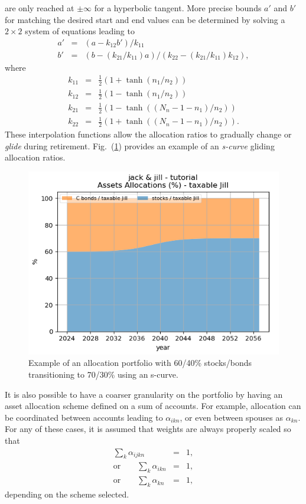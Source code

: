 \documentclass{report}[fleqn,11pt]
\begin{document}
\begin{description}[leftmargin=4em,style=multiline]
	are only reached at $\pm \infty$ for a hyperbolic tangent.
	More precise bounds $a'$ and $b'$ for matching the desired start and end values
	can be determined by solving a $2\times 2$ system of equations leading to
	\begin{eqnarray}
		a' &=& (a - k_{12}b')/k_{11} \nonumber \\
		b' &=& (b - (k_{21}/k_{11})a)/(k_{22} - (k_{21}/k_{11})k_{12}),
	\end{eqnarray}
	where
	\begin{eqnarray}
		k_{11} &=& \frac{1}{2}(1 + \tanh(n_1/n_2)) \nonumber \\
		k_{12} &=& \frac{1}{2}(1 - \tanh(n_1/n_2)) \nonumber \\
		k_{21} &=& \frac{1}{2}(1 - \tanh((N_n-1-n_1)/n_2)) \nonumber \\
		k_{22} &=& \frac{1}{2}(1 + \tanh((N_n-1-n_1)/n_2)).
	\end{eqnarray}
	These interpolation functions allow the allocation ratios to gradually change
	or {\em glide} during retirement. Fig.~(\ref{Fig:allocations}) provides an example
	of an {\em s-curve} gliding allocation ratios.

	\begin{figure}[t]
	\includegraphics{allocations.png}
		\caption{\small Example of an allocation portfolio with 60/40\% stocks/bonds 
		transitioning to 70/30\% using an s-curve. \label{Fig:allocations}}
	\end{figure}
	It is also possible to have a coarser granularity on the portfolio by
	having an asset allocation scheme
	defined on a sum of accounts. For example, allocation can be coordinated between accounts
	leading to $\alpha_{ikn}$, or even between spouses as $\alpha_{kn}$.
	For any of these cases, it is assumed that weights are always properly scaled so that
	\begin{eqnarray}
		\sum_k \alpha_{ijkn} &=& 1, \nonumber\\
		\text{or} \qquad \sum_k \alpha_{ikn} &=& 1, \nonumber\\
		\text{or} \qquad \sum_k \alpha_{kn} &=& 1,
	\end{eqnarray}
	depending on the scheme selected.


\end{description}
\end{document}
